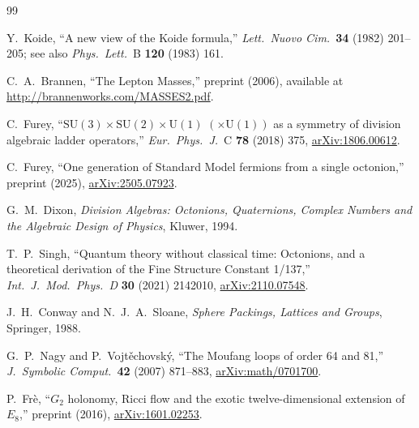 \documentclass[11pt,a4paper]{article}
\theoremstyle{remark}
\begin{document}

\begin{thebibliography}{99}

Y.~Koide,
``A new view of the Koide formula,''
\textit{Lett.\ Nuovo Cim.}\ \textbf{34} (1982) 201--205; see also
\textit{Phys.\ Lett.}\ B \textbf{120} (1983) 161.

C.~A.~Brannen,
``The Lepton Masses,''
preprint (2006), available at \url{http://brannenworks.com/MASSES2.pdf}.

C.~Furey,
``$\mathrm{SU}(3) \times \mathrm{SU}(2) \times \mathrm{U}(1)$ $(\times \mathrm{U}(1))$ as a
symmetry of division algebraic ladder operators,''
\textit{Eur.\ Phys.\ J.}\ C \textbf{78} (2018) 375,
\href{https://arxiv.org/abs/1806.00612}{arXiv:1806.00612}.

C.~Furey,
``One generation of Standard Model fermions from a single octonion,''
preprint (2025),
\href{https://arxiv.org/abs/2505.07923}{arXiv:2505.07923}.

G.~M.~Dixon,
\textit{Division Algebras: Octonions, Quaternions, Complex Numbers and the Algebraic
Design of Physics}, Kluwer, 1994.

T.~P.~Singh,
``Quantum theory without classical time: Octonions, and a theoretical derivation
of the Fine Structure Constant 1/137,''
\textit{Int.\ J.\ Mod.\ Phys.\ D} \textbf{30} (2021) 2142010,
\href{https://arxiv.org/abs/2110.07548}{arXiv:2110.07548}.

J.~H.~Conway and N.~J.~A.~Sloane,
\textit{Sphere Packings, Lattices and Groups}, Springer, 1988.

G.~P.~Nagy and P.~Vojt\v{e}chovsk\'y,
``The Moufang loops of order 64 and 81,''
\textit{J.\ Symbolic Comput.}\ \textbf{42} (2007) 871--883,
\href{https://arxiv.org/abs/math/0701700}{arXiv:math/0701700}.

P.~Fr\`e,
``$G_2$ holonomy, Ricci flow and the exotic twelve-dimensional extension of $E_8$,''
preprint (2016),
\href{https://arxiv.org/abs/1601.02253}{arXiv:1601.02253}.

\end{thebibliography}
\end{document}
